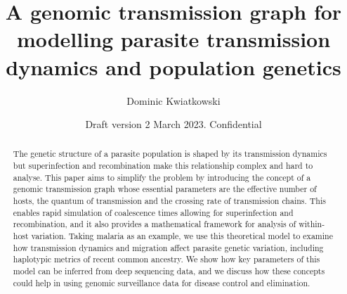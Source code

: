 \documentclass[hidelinks,10pt]{article}
\title{A genomic transmission graph for modelling parasite transmission dynamics and population genetics}
\date{Draft version 2 March 2023.  Confidential}
\author{Dominic Kwiatkowski}
\begin{document}
\maketitle

\begin{abstract}

The genetic structure of a parasite population is shaped by its transmission dynamics but superinfection and recombination make this relationship complex and hard to analyse.  This paper aims to simplify the problem by introducing the concept of a genomic transmission graph whose essential parameters are the effective number of hosts, the quantum of transmission and the crossing rate of transmission chains.  This enables rapid simulation of coalescence times allowing for superinfection and recombination, and it also provides a mathematical framework for analysis of within-host variation. Taking malaria as an example, we use this theoretical model to examine how transmission dynamics and migration affect parasite genetic variation, including haplotypic metrics of recent common ancestry.  We show how key parameters of this model can be inferred from deep sequencing data, and we discuss how these concepts could help in using genomic surveillance data for disease control and elimination. 

\end{abstract}






















%





\clearpage



\clearpage




%

%
%
\end{document}
